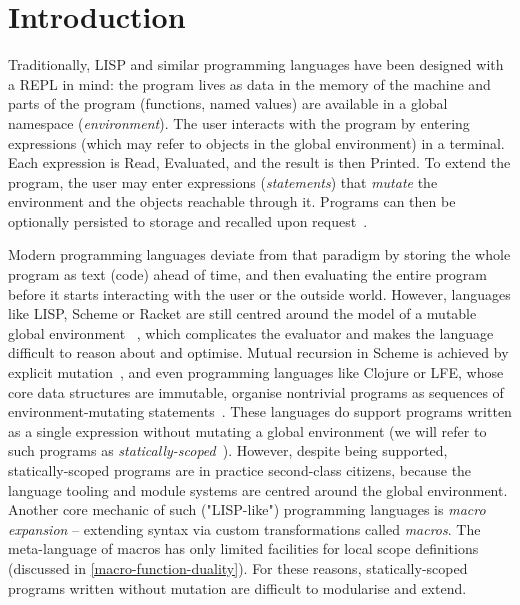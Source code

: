\section{Introduction}
\label{introduction}

Traditionally, LISP and similar programming languages have been designed with a
REPL in mind: the program lives as data in the memory of the machine and parts
of the program (functions, named values) are available in a global namespace
(\emph{environment}). The user interacts with the program by entering
expressions (which may refer to objects in the global environment) in a
terminal. Each expression is Read, Evaluated, and the result is then Printed.
To extend the program, the user may enter expressions
(\emph{statements}) that \emph{mutate} the environment and the objects reachable
through it. Programs can then be optionally persisted to storage
and recalled upon request~\cite{sexp,steele-gabriel-evolution}.

Modern programming languages deviate from that paradigm by storing the whole
program as text (code) ahead of time, and then evaluating the entire program
before it starts interacting with the user or the outside world.
However, languages like LISP, Scheme or Racket are
still centred around the model of a mutable global environment%
~\cite{steele-gabriel-evolution},
which complicates the evaluator and makes the language difficult to reason about and
optimise. Mutual recursion in Scheme is achieved
by explicit mutation~\cite[Chapter 4.1.6]{sicp}, and even programming languages
like Clojure or LFE, whose core data structures are immutable, organise
nontrivial programs as sequences of environment-mutating
statements~\cite{clojure-hist,lfe-reference}.
These languages do support programs written as a single expression without
mutating a global environment (we will refer to such programs as
\emph{statically-scoped}~\cite{kernel-report}).
However, despite being supported, statically-scoped programs are
in practice second-class citizens, because the language tooling and module systems
are centred around the global environment.
Another core mechanic of such ("LISP-like") programming languages is
\emph{macro expansion} – extending syntax via custom transformations called
\emph{macros}. The meta-language of macros has only limited facilities for local
scope definitions (discussed in \cref{macro-function-duality}).
For these reasons, statically-scoped programs written without mutation are
difficult to modularise and extend.

